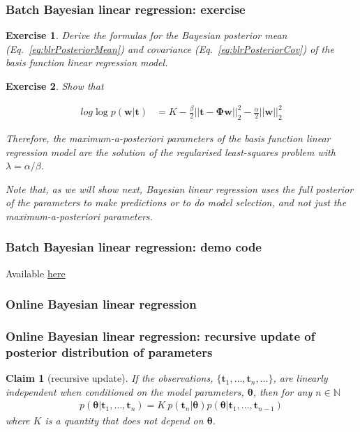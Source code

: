 \documentclass[11pt]{beamer}
\newtheorem{claim}{Claim}
\newtheorem{probExercise}{Exercise}
\begin{document}
\begin{frame}
    \frametitle{Batch Bayesian linear regression: exercise}

    \scriptsize
    \begin{probExercise}
		Derive the formulas for the Bayesian posterior mean
(Eq.~\ref{eq:blrPosteriorMean}) and covariance (Eq.~\ref{eq:blrPosteriorCov})
of the basis function linear regression model.
    \end{probExercise}

    \begin{probExercise}
        Show that

        \begin{align}
            log
            \log p(\mathbf{w}|\boldsymbol{t})&=K-\frac{\beta}{2}||\mathbf{t}-\boldsymbol{\Phi}\mathbf{w}||_2^2-\frac{\alpha}{2}||\mathbf{w}||_2^2
        \end{align}

        Therefore, the maximum-a-posteriori parameters of the basis function
        linear regression model are the solution of the regularised
        least-squares problem with $\lambda=\alpha/\beta$.

        Note that, as we will show next, Bayesian linear regression uses the
        full posterior of the parameters to make predictions or to do model
        selection, and not just the maximum-a-posteriori parameters.

    \end{probExercise}
    \normalsize

\end{frame}

\begin{frame}
    \frametitle{Batch Bayesian linear regression: demo code}
    Available \href{https://joacorapela.github.io/gcnuBridging2023/auto\_examples/bayesianLinearRegression/plotBatchBayesianLinearRegression.html\#sphx-glr-auto-examples-bayesianlinearregression-plotbatchbayesianlinearregression-py}{here}
\end{frame}

\subsubsection{Online Bayesian linear regression}

\begin{frame}
    \frametitle{Online Bayesian linear regression: recursive update of posterior distribution of parameters}
	\scriptsize
	\begin{claim}[recursive update]
		If the observations, $\{\mathbf{t}_1,\ldots,\mathbf{t}_n,\dots\}$, are linearly independent when conditioned on the model parameters, $\boldsymbol{\theta}$, then for any $n\in\mathbb{N}$
		\begin{align}
			p(\boldsymbol{\theta}|\mathbf{t}_1,\ldots,\mathbf{t}_n)=K\ p(\mathbf{t}_n|\boldsymbol{\theta})p(\boldsymbol{\theta}|\mathbf{t}_1,\ldots,\mathbf{t}_{n-1})
		\end{align}
		where $K$ is a quantity that does not depend on $\boldsymbol{\theta}$.
	\end{claim}
	\normalsize
\end{frame}
\end{document}
